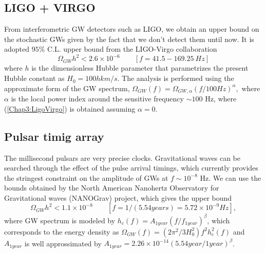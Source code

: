 \documentclass[11pt,a4paper,twoside]{book}
\begin{document}
\subsection*{LIGO + VIRGO}
From interferometric GW detectors such as LIGO, we obtain an upper bound on the stochastic GWs given  by the fact that we don't detect them until now. It is adopted $ 95\% $ C.L. upper bound from the LIGO-Virgo collaboration  \cite{Chap3:Ligo_Virgo}
\begin{equation}
	\label{Chap3:LigoVirgo}
	\Omega_{GW}h^{2} < 2.6 \times 10^{-6} \qquad  [f = 41.5 - 
	169.25\ Hz] 
\end{equation}
where $ h $ is the dimensionless Hubble parameter that parametrizes the present Hubble constant as $ H_{0} = 100h km/s $. The analysis is performed using the approximate form of the GW spectrum, $ \Omega_{GW}(f)=\Omega_{GW,\alpha}(f/100Hz)^{\alpha}, $ where $\alpha$ is the local power index around the sensitive frequency $\sim 100$ Hz, where (\ref{Chap3:LigoVirgo}) is obtained assuming $\alpha=0$.
\subsection*{Pulsar timig array}
 The millisecond pulsars are very precise clocks. Gravitational waves can be searched through the effect of the pulse arrival timings, which currently provides the stringest constraint on the amplitude of GWs at $ f\sim 10^{-8} $ Hz. We can use the bounds obtained by the North American Nanohertz Observatory for Gravitational waves (NANOGrav) project, which gives the upper bound \cite{Chap3:PulsarTiming}
 \begin{equation}
 	\Omega_{GW}h^{2} < 1.1 \times 10^{-8}   \qquad [f = 1/(5.54 years) = 5.72 \times 10^{-9} Hz],
 \end{equation}
where GW spectrum is modeled by $ h_{c}(f) = A_{1year}(f/f_{1year})^{\beta} $, which corresponds to the energy density as $\Omega_{GW}(f)=(2\pi^{2}/3H_{0}^{2})f^{2}h_{c}^{2}(f)$ and $ A_{1year} $ is well approssimated by $ A_{1year}=2.26\times 10^{-14}(5.54year/1year)^{\beta}$.
\end{document}
